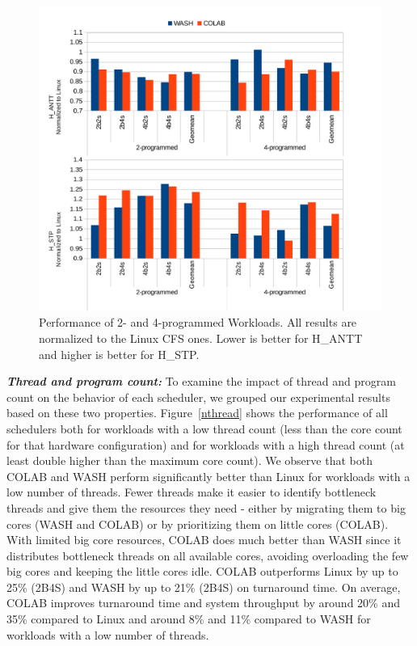 \begin{figure}
\centering
\includegraphics[scale=0.55]{figures/nprog.pdf}
\caption{Performance of 2- and 4-programmed Workloads. All results are normalized to the Linux CFS ones. Lower is better for H\_ANTT and higher is better for H\_STP.}
\label{nprog}
\end{figure}
\textbf{\textit{Thread and program count:}}
To examine the impact of thread and program count on the behavior of each scheduler, we grouped our experimental results based on these two properties. Figure~\ref{nthread} shows the performance of all schedulers both for workloads with a low thread count (less than the core count for that hardware configuration) and for workloads with a high thread count (at least double higher than the maximum core count). We observe that both COLAB and WASH perform significantly better than Linux for workloads with a low number of threads. Fewer threads make it easier to identify bottleneck threads and give them the resources they need - either by migrating them to big cores (WASH and COLAB) or by prioritizing them on little cores (COLAB). With limited big core resources, COLAB does much better than WASH since it distributes bottleneck threads on all available cores, avoiding overloading the few big cores and keeping the little cores idle. COLAB outperforms Linux by up to 25\% (2B4S) and WASH by up to 21\% (2B4S) on turnaround time. On average, COLAB improves turnaround time and system throughput by around 20\% and 35\% compared to Linux and around 8\% and 11\% compared to WASH for workloads with a low number of threads.
